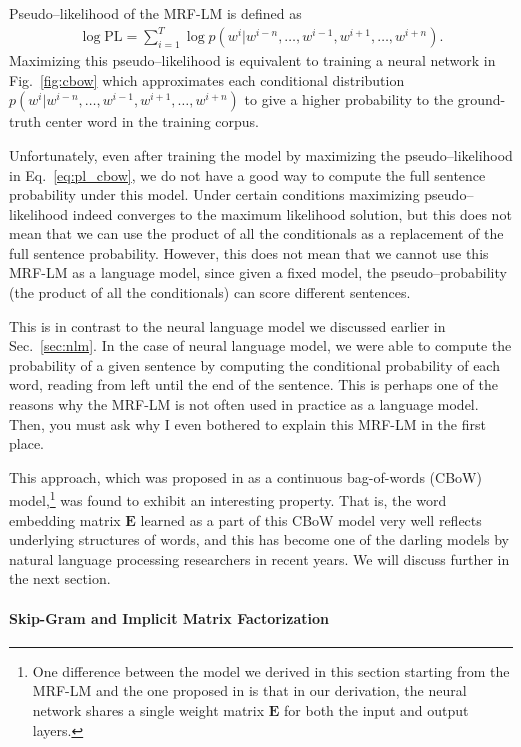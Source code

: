 \documentclass{report}
\newcommand{\matr}[1]{\mathbf{#1}}
\newcommand{\mE}[0]{\matr{E}}
\newcommand{\PL}{\text{PL}}
\begin{document}
Pseudo--likelihood of the MRF-LM is defined as
\begin{align}
    \label{eq:pl_cbow}
    \log \PL = \sum_{i=1}^T \log p(w^i | w^{i-n}, \ldots, w^{i-1}, w^{i+1}, \ldots,
    w^{i+n}).
\end{align}
Maximizing this pseudo--likelihood is equivalent to training a neural network in
Fig.~\ref{fig:cbow} which approximates each conditional distribution $p(w^i |
w^{i-n}, \ldots, w^{i-1}, w^{i+1}, \ldots, w^{i+n})$ to give a higher
probability to the ground-truth center word in the training corpus.

Unfortunately, even after training the model by maximizing the pseudo--likelihood
in Eq.~\eqref{eq:pl_cbow}, we do not have a good way to compute the full
sentence probability under this model. Under certain conditions maximizing
pseudo--likelihood indeed converges to the maximum likelihood solution, but this
does not mean that we can use the product of all the conditionals as a
replacement of the full sentence probability. However, this does not mean that
we cannot use this MRF-LM as a language model, since given a fixed model, the
pseudo--probability (the product of all the conditionals) can score different
sentences. 

This is in contrast to the neural language model we discussed earlier in
Sec.~\ref{sec:nlm}. In the case of neural language model, we were able to
compute the probability of a given sentence by computing the conditional
probability of each word, reading from left until the end of the sentence. This
is perhaps one of the reasons why the MRF-LM is not often used in practice as a
language model. Then, you must ask why I even bothered to explain this MRF-LM in
the first place.

This approach, which was proposed in \cite{mikolov2013efficient} as a
continuous bag-of-words (CBoW) model,\footnote{
    One difference between the model we derived in this section starting from
    the MRF-LM and the one proposed in \cite{mikolov2013efficient} is that in
    our derivation, the neural network shares a single weight matrix $\mE$ for
    both the input and output layers.
} was found to exhibit an interesting property. That is, the word embedding
matrix $\mE$ learned as a part of this CBoW model very well reflects underlying
structures of words, and this has become one of the darling models by natural
language processing researchers in recent years. We will discuss further in the
next section.

\paragraph{Skip-Gram and Implicit Matrix Factorization}
\end{document}
